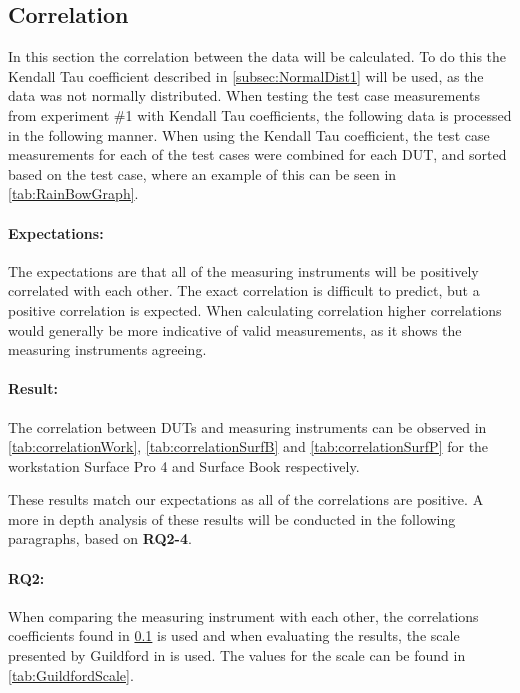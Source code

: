 \subsection{Correlation}\label{subsec:correlation1}
In this section the correlation between the data will be calculated. To do this the Kendall Tau coefficient\cite{kendall1938new} described in \cref{subsec:NormalDist1} will be used, as the data was not normally distributed. When testing the test case measurements from experiment \#1 with Kendall Tau coefficients, the following data is processed in the following manner. When using the Kendall Tau coefficient, the test case measurements for each of the test cases were combined for each DUT, and sorted based on the test case, where an example of this can be seen in \cref{tab:RainBowGraph}.



\paragraph{Expectations:} The expectations are that all of the measuring instruments will be positively correlated with each other. The exact correlation is difficult to predict, but a positive correlation is expected. When calculating correlation higher correlations would generally be more indicative of valid measurements, as it shows the measuring instruments agreeing.

\paragraph{Result:} The correlation between DUTs and measuring instruments can be observed in \cref{tab:correlationWork},  \cref{tab:correlationSurfB} and \cref{tab:correlationSurfP} for the workstation Surface Pro 4 and Surface Book respectively.




These results match our expectations as all of the correlations are positive. A more in depth analysis of these results will be conducted in the following paragraphs, based on \textbf{RQ2-4}.

\paragraph{RQ2:} When comparing the measuring instrument with each other, the correlations coefficients found in \cref{subsec:correlation1} is used and when evaluating the results, the scale presented by Guildford in \cite[219]{guilford1950fundamental} is used. The values for the scale can be found in \cref{tab:GuildfordScale}.

